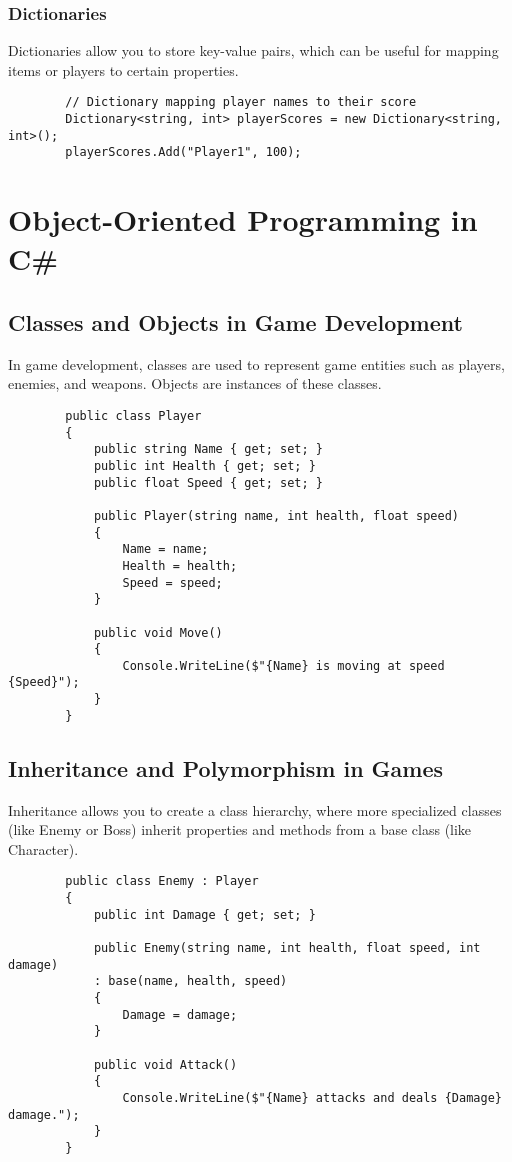 \documentclass[a4paper,12pt]{book}
\begin{document}
	\subsection{Dictionaries}
	Dictionaries allow you to store key-value pairs, which can be useful for mapping items or players to certain properties.
	
	\begin{lstlisting}
		// Dictionary mapping player names to their score
		Dictionary<string, int> playerScores = new Dictionary<string, int>();
		playerScores.Add("Player1", 100);
	\end{lstlisting}
	
	\chapter{Object-Oriented Programming in C\#}
	\section{Classes and Objects in Game Development}
	In game development, classes are used to represent game entities such as players, enemies, and weapons. Objects are instances of these classes.
	
	\begin{lstlisting}
		public class Player
		{
			public string Name { get; set; }
			public int Health { get; set; }
			public float Speed { get; set; }
			
			public Player(string name, int health, float speed)
			{
				Name = name;
				Health = health;
				Speed = speed;
			}
			
			public void Move()
			{
				Console.WriteLine($"{Name} is moving at speed {Speed}");
			}
		}
	\end{lstlisting}
	
	\section{Inheritance and Polymorphism in Games}
	Inheritance allows you to create a class hierarchy, where more specialized classes (like Enemy or Boss) inherit properties and methods from a base class (like Character).
	
	\begin{lstlisting}
		public class Enemy : Player
		{
			public int Damage { get; set; }
			
			public Enemy(string name, int health, float speed, int damage)
			: base(name, health, speed)
			{
				Damage = damage;
			}
			
			public void Attack()
			{
				Console.WriteLine($"{Name} attacks and deals {Damage} damage.");
			}
		}
	\end{lstlisting}
	
\end{document}
